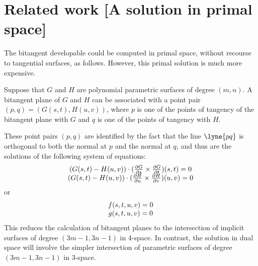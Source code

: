 \documentclass[12pt]{article}
\newif\ifJournal
\begin{document}
\clearpage


\section{Related work [A solution in primal space]}
\label{sec:comparison}


The bitangent developable could be computed in primal space,
without recourse to tangential surfaces, as follows.
However, this primal solution is much more expensive.

Suppose that $G$ and $H$ are polynomial parametric surfaces of degree $(m,n)$.
A bitangent plane of $G$ and $H$ can be associated with a point pair
$(p,q) = (G(s,t),H(u,v))$, where
$p$ is one of the points of tangency of the bitangent plane with $G$
and $q$ is one of the points of tangency with $H$.
\ifJournal
\footnote{The normal of this bitangent plane is the normal of $G$ at $p$.}
\fi
These point pairs $(p,q)$ are identified by the fact that the line $\lyne{pq}$
is orthogonal to both the normal at $p$ and the normal at $q$,
and thus are the solutions of the following system of equations:
\begin{equation}
\label{eq:otherbi}
\begin{tabular}{c}
$(G(s,t) - H(u,v)) \cdot (\frac{\partial G}{\partial s} \times 
			 \frac{\partial G}{\partial t}) (s,t) = 0$ \\
$(G(s,t) - H(u,v)) \cdot (\frac{\partial H}{\partial u} \times 
			 \frac{\partial H}{\partial v}) (u,v) = 0$ \\
\end{tabular}			 
\end{equation}
or
\[
\begin{tabular}{c}
$f(s,t,u,v) = 0$\\
$g(s,t,u,v) = 0$
\end{tabular}
\]
This reduces the calculation of bitangent planes to the 
intersection of implicit surfaces of degree $(3m-1,3n-1)$ in 4-space.
In contrast, the solution in dual space will involve the 
simpler intersection of parametric surfaces of degree
$(3m-1,3n-1)$ in 3-space.
\end{document}

